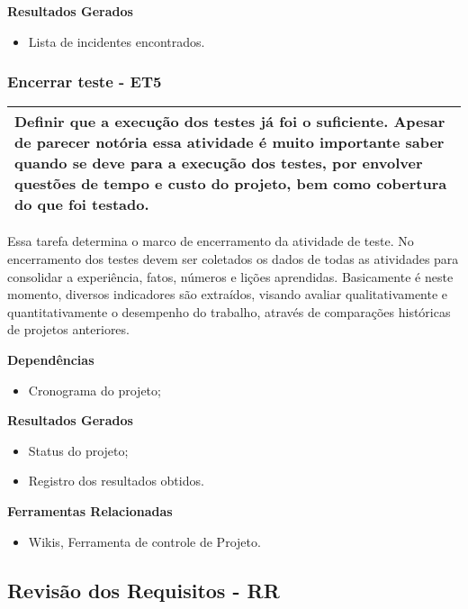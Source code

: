 \textbf{Resultados Gerados}
\begin{itemize}
\item Lista de incidentes encontrados.
\end{itemize}

\subsubsection{Encerrar teste - ET5}
\label{sec:et5}

\begin{table}[!ht]
\centering
\begin{tabular}{|p{130mm}|}
\hline
Definir que a execução dos testes já foi o suficiente. Apesar de parecer notória essa atividade é muito importante saber quando se   deve para a execução dos testes, por envolver questões de tempo e custo do   projeto, bem como cobertura do que foi testado. \\ 
\hline
\end{tabular}
\end{table}

Essa tarefa determina o marco de encerramento da atividade de teste. No encerramento dos testes devem ser coletados os dados de todas as atividades para consolidar a experiência, fatos, números e lições aprendidas. Basicamente é neste momento, diversos indicadores são extraídos, visando avaliar qualitativamente e quantitativamente o desempenho do trabalho, através de comparações históricas de projetos anteriores.

\textbf{Dependências}
\begin{itemize}
    \item Cronograma do projeto;
\end{itemize}

\textbf{Resultados Gerados}
\begin{itemize}
    \item Status do projeto;
    \item Registro dos resultados obtidos.
\end{itemize}

\textbf{Ferramentas Relacionadas}
\begin{itemize}
\item Wikis, Ferramenta de controle de Projeto.
\end{itemize}

\subsection{Revisão dos Requisitos - RR}
\label{sec:revrequisitos}

